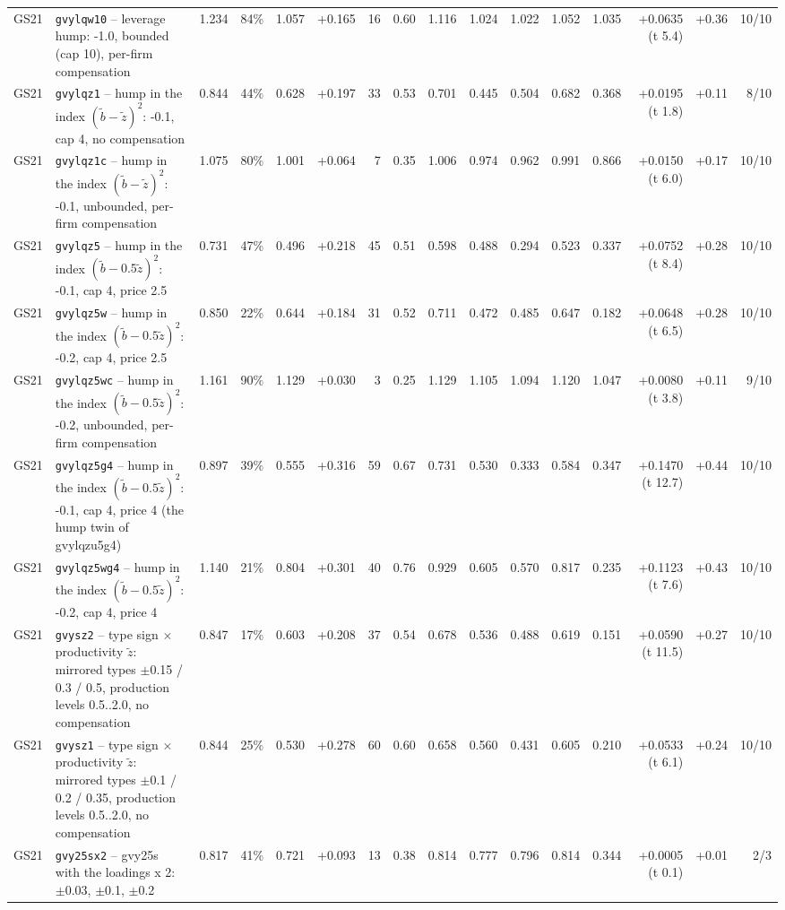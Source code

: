 \begin{landscape}
\begin{longtable}{lp{4.6cm}rrrrrrrrrrrrrr}
GS21 & \texttt{gvylqw10} -- leverage hump: -1.0, bounded (cap 10), per-firm compensation & 1.234 & 84\% & 1.057 & +0.165 & 16 & 0.60 & 1.116 & 1.024 & 1.022 & 1.052 & 1.035 & +0.0635 (t 5.4) & +0.36 & 10/10 \\
GS21 & \texttt{gvylqz1} -- hump in the index $(\tilde b - \tilde z)^2$: -0.1, cap 4, no compensation & 0.844 & 44\% & 0.628 & +0.197 & 33 & 0.53 & 0.701 & 0.445 & 0.504 & 0.682 & 0.368 & +0.0195 (t 1.8) & +0.11 & 8/10 \\
GS21 & \texttt{gvylqz1c} -- hump in the index $(\tilde b - \tilde z)^2$: -0.1, unbounded, per-firm compensation & 1.075 & 80\% & 1.001 & +0.064 & 7 & 0.35 & 1.006 & 0.974 & 0.962 & 0.991 & 0.866 & +0.0150 (t 6.0) & +0.17 & 10/10 \\
GS21 & \texttt{gvylqz5} -- hump in the index $(\tilde b - 0.5\tilde z)^2$: -0.1, cap 4, price 2.5 & 0.731 & 47\% & 0.496 & +0.218 & 45 & 0.51 & 0.598 & 0.488 & 0.294 & 0.523 & 0.337 & +0.0752 (t 8.4) & +0.28 & 10/10 \\
GS21 & \texttt{gvylqz5w} -- hump in the index $(\tilde b - 0.5\tilde z)^2$: -0.2, cap 4, price 2.5 & 0.850 & 22\% & 0.644 & +0.184 & 31 & 0.52 & 0.711 & 0.472 & 0.485 & 0.647 & 0.182 & +0.0648 (t 6.5) & +0.28 & 10/10 \\
GS21 & \texttt{gvylqz5wc} -- hump in the index $(\tilde b - 0.5\tilde z)^2$: -0.2, unbounded, per-firm compensation & 1.161 & 90\% & 1.129 & +0.030 & 3 & 0.25 & 1.129 & 1.105 & 1.094 & 1.120 & 1.047 & +0.0080 (t 3.8) & +0.11 & 9/10 \\
GS21 & \texttt{gvylqz5g4} -- hump in the index $(\tilde b - 0.5\tilde z)^2$: -0.1, cap 4, price 4 (the hump twin of gvylqzu5g4) & 0.897 & 39\% & 0.555 & +0.316 & 59 & 0.67 & 0.731 & 0.530 & 0.333 & 0.584 & 0.347 & +0.1470 (t 12.7) & +0.44 & 10/10 \\
GS21 & \texttt{gvylqz5wg4} -- hump in the index $(\tilde b - 0.5\tilde z)^2$: -0.2, cap 4, price 4 & 1.140 & 21\% & 0.804 & +0.301 & 40 & 0.76 & 0.929 & 0.605 & 0.570 & 0.817 & 0.235 & +0.1123 (t 7.6) & +0.43 & 10/10 \\
GS21 & \texttt{gvysz2} -- type sign $\times$ productivity $\tilde z$: mirrored types $\pm$0.15 / 0.3 / 0.5, production levels 0.5..2.0, no compensation & 0.847 & 17\% & 0.603 & +0.208 & 37 & 0.54 & 0.678 & 0.536 & 0.488 & 0.619 & 0.151 & +0.0590 (t 11.5) & +0.27 & 10/10 \\
GS21 & \texttt{gvysz1} -- type sign $\times$ productivity $\tilde z$: mirrored types $\pm$0.1 / 0.2 / 0.35, production levels 0.5..2.0, no compensation & 0.844 & 25\% & 0.530 & +0.278 & 60 & 0.60 & 0.658 & 0.560 & 0.431 & 0.605 & 0.210 & +0.0533 (t 6.1) & +0.24 & 10/10 \\
GS21 & \texttt{gvy25sx2} -- gvy25s with the loadings x 2: $\pm$0.03, $\pm$0.1, $\pm$0.2 & 0.817 & 41\% & 0.721 & +0.093 & 13 & 0.38 & 0.814 & 0.777 & 0.796 & 0.814 & 0.344 & +0.0005 (t 0.1) & +0.01 & 2/3 \\
\end{longtable}


\end{landscape}
